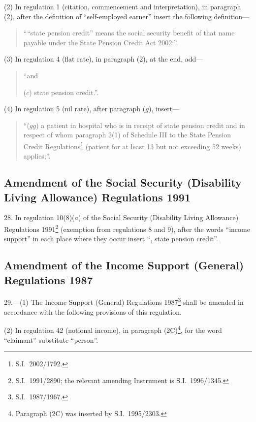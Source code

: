 \documentclass[12pt,a4paper]{article}
\begin{document}
(2) In regulation 1 (citation, commencement and interpretation), in paragraph (2), after the definition of “self-employed earner” insert the following definition—
\begin{quotation}
““state pension credit” means the social security benefit of that name payable under the State Pension Credit Act 2002;”.
\end{quotation}

(3) In regulation 4 (flat rate), in paragraph (2), at the end, add—
\begin{quotation}
    “and

    ($c$) 
    state pension credit.”. 
\end{quotation}

(4) In regulation 5 (nil rate), after paragraph ($g$), insert—
\begin{quotation}
“($gg$) a patient in hospital who is in receipt of state pension credit and in respect of whom paragraph 2(1) of Schedule III to the State Pension Credit Regulations\footnote{S.I.\ 2002/1792.} (patient for at least 13 but not exceeding 52 weeks) applies;”.
\end{quotation}

\subsection[28. Amendment of the Social Security (Disability Living Allowance) Regulations 1991]{\sloppy Amendment of the Social Security (Disability Living Allowance) Regulations 1991}

28.  In regulation 10(8)($a$)  of the Social Security (Disability Living Allowance) Regulations 1991\footnote{S.I.\ 1991/2890; the relevant amending Instrument is S.I.\ 1996/1345.} (exemption from regulations 8 and 9), after the words “income support” in each place where they occur insert “, state pension credit”.

\subsection[29. Amendment of the Income Support (General) Regulations 1987]{\sloppy Amendment of the Income Support (General) Regulations 1987}

29.---(1)  The Income Support (General) Regulations 1987\footnote{S.I.\ 1987/1967.} shall be amended in accordance with the following provisions of this regulation.

(2) In regulation 42 (notional income), in paragraph (2C)\footnote{Paragraph (2C) was inserted by S.I.\ 1995/2303.}, for the word “claimant” substitute “person”.
\end{document}

